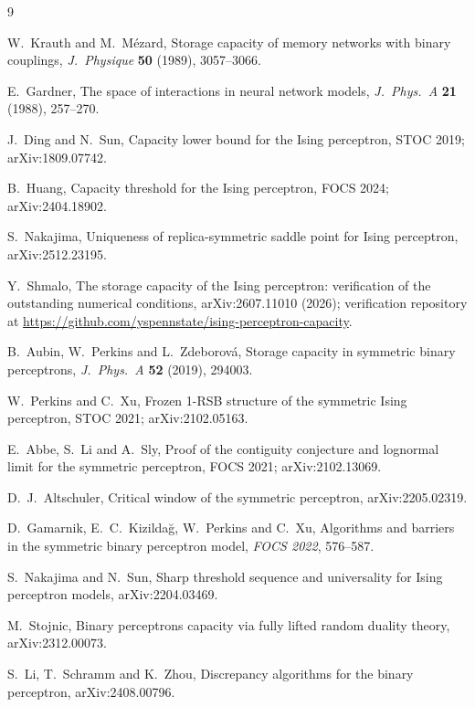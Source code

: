 \documentclass[11pt]{article}
\theoremstyle{remark}
\begin{document}
\begin{thebibliography}{9}

W.~Krauth and M.~M\'ezard,
Storage capacity of memory networks with binary couplings,
\emph{J.~Physique} \textbf{50} (1989), 3057--3066.

E.~Gardner,
The space of interactions in neural network models,
\emph{J.~Phys.~A} \textbf{21} (1988), 257--270.

J.~Ding and N.~Sun,
Capacity lower bound for the Ising perceptron,
STOC 2019; arXiv:1809.07742.

B.~Huang,
Capacity threshold for the Ising perceptron,
FOCS 2024; arXiv:2404.18902.

S.~Nakajima,
Uniqueness of replica-symmetric saddle point for Ising perceptron,
arXiv:2512.23195.

Y.~Shmalo,
The storage capacity of the Ising perceptron: verification of the
outstanding numerical conditions,
arXiv:2607.11010 (2026); verification repository at
\url{https://github.com/yspennstate/ising-perceptron-capacity}.

B.~Aubin, W.~Perkins and L.~Zdeborov\'a,
Storage capacity in symmetric binary perceptrons,
\emph{J.~Phys.~A} \textbf{52} (2019), 294003.

W.~Perkins and C.~Xu,
Frozen 1-RSB structure of the symmetric Ising perceptron,
STOC 2021; arXiv:2102.05163.

E.~Abbe, S.~Li and A.~Sly,
Proof of the contiguity conjecture and lognormal limit for the
symmetric perceptron,
FOCS 2021; arXiv:2102.13069.

D.~J.~Altschuler,
Critical window of the symmetric perceptron,
arXiv:2205.02319.

D.~Gamarnik, E.~C.~Kizilda\u{g}, W.~Perkins and C.~Xu,
Algorithms and barriers in the symmetric binary perceptron model,
\emph{FOCS 2022}, 576--587.

S.~Nakajima and N.~Sun,
Sharp threshold sequence and universality for Ising perceptron
models,
arXiv:2204.03469.

M.~Stojnic,
Binary perceptrons capacity via fully lifted random duality theory,
arXiv:2312.00073.

S.~Li, T.~Schramm and K.~Zhou,
Discrepancy algorithms for the binary perceptron,
arXiv:2408.00796.

\end{thebibliography}
\end{document}
